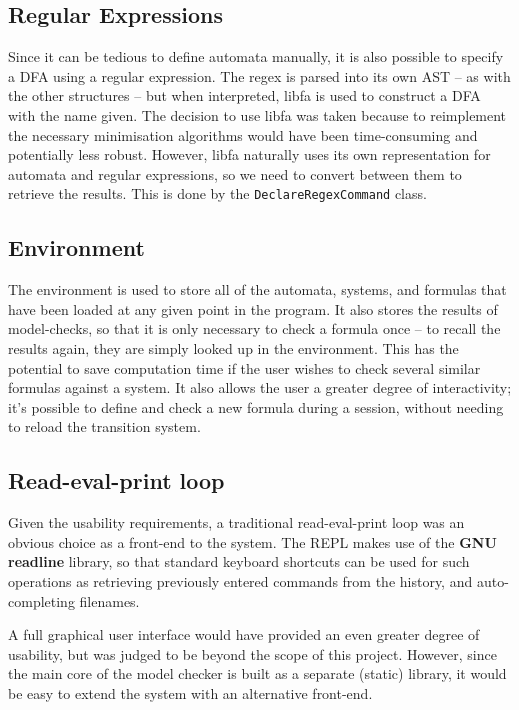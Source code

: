 \documentclass[11pt]{article}
\theoremstyle{definition}
\begin{document}

\subsection{Regular Expressions}
Since it can be tedious to define automata manually, it is also possible to
specify a DFA using a regular expression. The regex is parsed into its own AST
-- as with the other structures -- but when interpreted, libfa is used to
construct a DFA with the name given. The decision to use libfa was taken
because to reimplement the necessary minimisation algorithms would have been
time-consuming and potentially less robust. However, libfa naturally uses its
own representation for automata and regular expressions, so we need to convert
between them to retrieve the results. This is done by the
\texttt{DeclareRegexCommand} class.

\subsection{Environment}

The environment is used to store all of the automata, systems, and formulas
that have been loaded at any given point in the program. It also stores the
results of model-checks, so that it is only necessary to check a formula once
-- to recall the results again, they are simply looked up in the environment.
This has the potential to save computation time if the user wishes to check
several similar formulas against a system. It also allows the user a greater
degree of interactivity; it's possible to define and check a new formula during
a session, without needing to reload the transition system.

\subsection{Read-eval-print loop}

Given the usability requirements, a traditional read-eval-print loop was an
obvious choice as a front-end to the system.  The REPL makes use of the
\textbf{GNU readline} library, so that standard keyboard shortcuts can be used
for such operations as retrieving previously entered commands from the history,
and auto-completing filenames. 

A full graphical user interface would have provided an even greater degree of
usability, but was judged to be beyond the scope of this project. However,
since the main core of the model checker is built as a separate (static)
library, it would be easy to extend the system with an alternative front-end.
\end{document}
